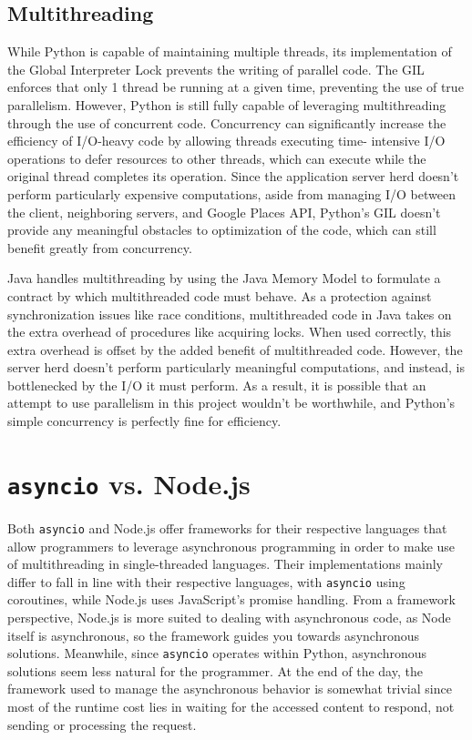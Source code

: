 \subsection{Multithreading}
\par
While Python is capable of maintaining multiple threads, its implementation of
the Global Interpreter Lock prevents the writing of parallel code. The GIL
enforces that only 1 thread be running at a given time, preventing the use of
true parallelism. However, Python is still fully capable of leveraging
multithreading through the use of concurrent code. Concurrency can significantly
increase the efficiency of I/O-heavy code by allowing threads executing time-
intensive I/O operations to defer resources to other threads, which can execute
while the original thread completes its operation. Since the application server
herd doesn't perform particularly expensive computations, aside from managing
I/O between the client, neighboring servers, and Google Places API, Python's
GIL doesn't provide any meaningful obstacles to optimization of the code, which
can still benefit greatly from concurrency.
\par
Java handles multithreading by using the Java Memory Model to formulate a
contract by which multithreaded code must behave. As a protection against
synchronization issues like race conditions, multithreaded code in Java takes on
the extra overhead of procedures like acquiring locks. When used correctly, this
extra overhead is offset by the added benefit of multithreaded code. However,
the server herd doesn't perform particularly meaningful computations, and
instead, is bottlenecked by the I/O it must perform. As a result, it is
possible that an attempt to use parallelism in this project wouldn't be
worthwhile, and Python's simple concurrency is perfectly fine for efficiency.

\section{\texttt{asyncio} vs. Node.js}
\par
Both \texttt{asyncio} and Node.js offer frameworks for their respective
languages that allow programmers to leverage asynchronous programming in order
to make use of multithreading in single-threaded languages. Their
implementations mainly differ to fall in line with their respective languages,
with \texttt{asyncio} using coroutines, while Node.js uses JavaScript's promise
handling. From a framework perspective, Node.js is more suited to dealing with
asynchronous code, as Node itself is asynchronous, so the framework guides you
towards asynchronous solutions. Meanwhile, since \texttt{asyncio} operates
within Python, asynchronous solutions seem less natural for the programmer. At
the end of the day, the framework used to manage the asynchronous behavior is
somewhat trivial since most of the runtime cost lies in waiting for the accessed
content to respond, not sending or processing the request.


